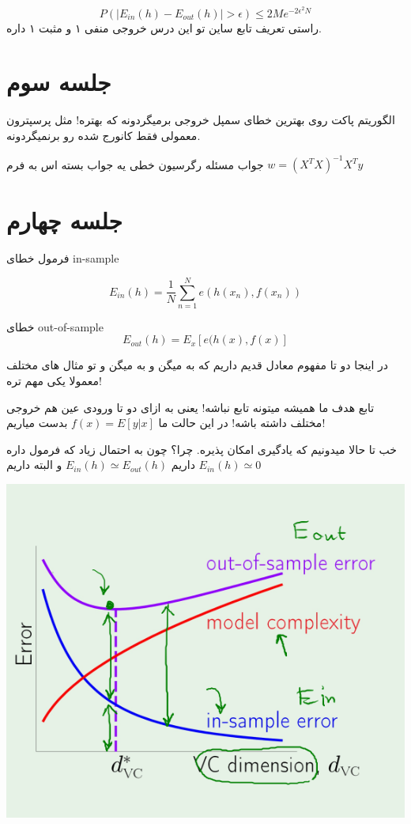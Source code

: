 \documentclass[twocolumn,11pt]{article}
\begin{document}
\begin{equation}
P(|E_{in}(h) - E_{out}(h)| > \epsilon) \leq 2 M e^{-2 \epsilon^2 N}
\end{equation}
راستی تعریف تابع ساین تو این درس خروجی منفی ۱ و مثبت ۱ داره. 

\section{جلسه سوم}
الگوریتم پاکت روی بهترین خطای سمپل خروجی برمیگردونه که بهتره! مثل پرسپترون معمولی فقط کانورج شده رو 
برنمیگردونه. 

جواب مسئله رگرسیون خطی یه جواب بسته اس به فرم
$w = (X^T X)^{-1} X^T y$

\clearpage
\section{جلسه چهارم}
فرمول خطای in-sample

\begin{equation}
E_{in}(h) = \frac{1}{N} \sum_{n=1}^N
 e(h(x_n),f(x_n)) 
 \end{equation}
 
 خطای out-of-sample
\begin{equation}
E_{out}(h) = E_x[e(h(x),f(x)]
\end{equation}

در اینجا دو تا مفهوم معادل قدیم داریم که به
  میگن 
 و به 
میگن 
و تو مثال های مختلف معمولا یکی مهم تره! 

تابع هدف ما همیشه میتونه تابع نباشه! یعنی به ازای دو تا ورودی عین هم خروجی مختلف داشته باشه! 
در این حالت ما 
$f(x) = E[y|x]$
بدست میاریم!

خب تا حالا میدونیم که یادگیری امکان پذیره. چرا؟ چون به احتمال زیاد که فرمول داره داریم
$E_{in}(h) \simeq E_{out}(h)$
و البته داریم
$E_{in}(h) \simeq 0$

\includegraphics[scale=0.5]{vc-error.png} 
\end{document}
